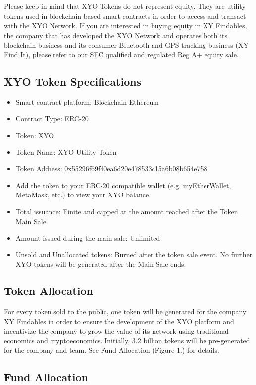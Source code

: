 \documentclass{article}
\begin{document}
Please keep in mind that XYO Tokens do not represent equity. They are utility tokens used in blockchain-based \glspl{smart-contract} in order to access and transact with the XYO Network. If you are interested in buying equity in XY Findables, the company that has developed the XYO Network and operates both its blockchain business and its consumer Bluetooth and GPS tracking business (XY Find It), please refer to our SEC qualified and regulated Reg A+ equity sale.


\subsection {XYO Token Specifications}
\begin{itemize}
\item Smart contract platform: Blockchain Ethereum
\item Contract Type: ERC-20
\item Token: XYO
\item Token Name: \Gls{XYO} Utility Token
\item Token Address: 0x55296f69f40ea6d20e478533c15a6b08b654e758
\item Add the token to your ERC-20 compatible wallet (e.g. myEtherWallet, MetaMask, etc.) to view your XYO balance.
\item Total issuance: Finite and capped at the amount reached after the Token Main Sale
\item Amount issued during the main sale: Unlimited
\item Unsold and Unallocated tokens: Burned after the token sale event. No further XYO tokens will be generated after the Main Sale ends.
\end{itemize}

\subsection {Token Allocation}
For every token sold to the public, one token will be generated for the company XY Findables in order to ensure the development of the \Gls{XYO} platform and incentivize the company to grow the value of its network using traditional economics and \gls{cryptoeconomics}.
Initially, 3.2 billion tokens will be pre-generated for the company and team. See Fund Allocation (Figure 1.) for details.
\clearpage

\subsection {Fund Allocation}
\end{document}
